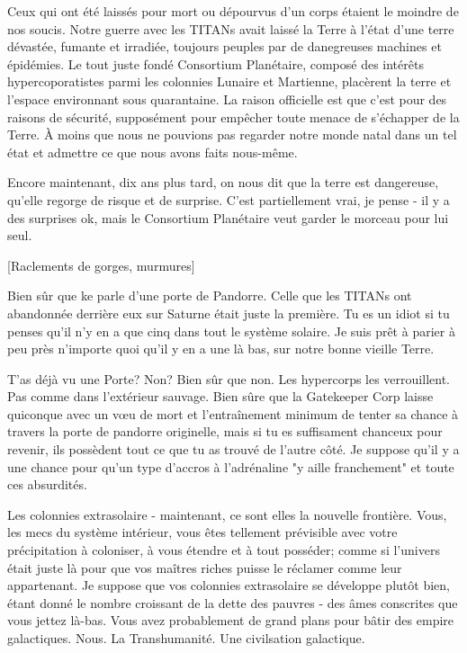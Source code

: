 Ceux qui ont été laissés pour mort ou dépourvus d'un corps étaient le moindre de nos soucis. Notre guerre avec les TITANs avait laissé la Terre  à l'état d'une terre dévastée, fumante et irradiée, toujours peuples par de danegreuses machines et épidémies. Le tout juste fondé Consortium Planétaire, composé des intérêts hypercoporatistes parmi les colonnies Lunaire et Martienne, placèrent la terre et l'espace environnant sous quarantaine. La raison officielle est que c'est pour des raisons de sécurité, supposément pour empêcher toute menace de s'échapper de la Terre. À moins que nous ne pouvions pas regarder notre monde natal dans un tel état et admettre ce que nous avons faits nous-même. 

Encore maintenant, dix ans plus tard, on nous dit que la terre est dangereuse, qu'elle regorge de risque et de surprise. C'est partiellement vrai, je pense - il y a des surprises ok, mais le Consortium Planétaire veut garder le morceau pour lui seul. 

[Raclements de gorges, murmures] 

Bien sûr que ke parle d'une porte de Pandorre. Celle que les TITANs ont abandonnée derrière eux sur Saturne était juste la première. Tu es un idiot si tu penses qu'il n'y en a que cinq dans tout le système solaire. Je suis prêt à parier à peu près n'importe quoi qu'il y en a une là bas, sur notre bonne vieille Terre. 

T'as déjà vu une Porte? Non? Bien sûr que non. Les hypercorps les verrouillent. Pas comme dans l'extérieur sauvage. Bien sûre que la Gatekeeper Corp laisse quiconque avec un vœu de mort et l'entraînement minimum de tenter sa chance à travers la porte de pandorre originelle, mais si tu es suffisament chanceux pour revenir, ils possèdent tout ce que tu as trouvé de l'autre côté. Je suppose qu'il y a une chance pour qu'un type d'accros à l'adrénaline "y aille franchement" et toute ces absurdités. 

Les colonnies extrasolaire - maintenant, ce sont elles la nouvelle frontière. Vous, les mecs du système intérieur, vous êtes tellement prévisible avec votre précipitation à coloniser, à vous étendre et à tout posséder; comme si l'univers était juste là pour que vos maîtres riches puisse le réclamer comme leur appartenant. Je suppose que vos colonnies extrasolaire se développe plutôt bien, étant donné le nombre croissant de la dette des pauvres - des âmes conscrites que vous jettez là-bas. Vous avez probablement de grand plans pour bâtir des empire galactiques. Nous. La Transhumanité. Une civilsation galactique. 

